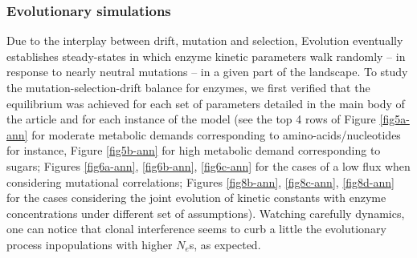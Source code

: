 \subsubsection{Evolutionary simulations\label{sec:ER}}

Due to the interplay between drift, mutation and selection, Evolution eventually establishes steady-states in which enzyme kinetic parameters walk randomly -- in response to nearly neutral mutations -- in a given part of the landscape. To study the mutation-selection-drift balance for enzymes, we first verified that the equilibrium was achieved for each set of parameters detailed in the main body of the article and for each instance of the model (see the top 4 rows of Figure \ref{fig5a-ann} for moderate metabolic demands corresponding to amino-acids/nucleotides for instance, Figure \ref{fig5b-ann} for high metabolic demand corresponding to sugars; Figures \ref{fig6a-ann}, \ref{fig6b-ann}, \ref{fig6c-ann} for the cases of a low flux when considering mutational correlations; Figures \ref{fig8b-ann}, \ref{fig8c-ann}, \ref{fig8d-ann} for the cases considering the joint evolution of kinetic constants with enzyme concentrations under different set of assumptions). Watching carefully dynamics, one can notice that clonal interference seems to curb a little the evolutionary process inpopulations with higher $N_e$s, as expected.

